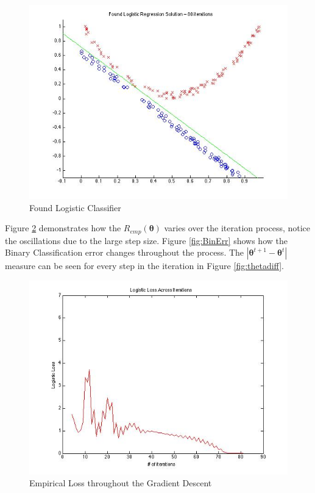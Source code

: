 \documentclass[paper=a4, fontsize=11pt]{scrartcl} %
\begin{document}
\begin{figure}
\centering
\includegraphics[scale=0.4]{prob3sol.jpg}
\caption{Found Logistic Classifier}
\label{fig:classifier}
\end{figure}

Figure \ref{fig:loss} demonstrates how the $R_{emp}(\bm{\theta})$ varies over the iteration process, notice the oscillations due to the large step size.  Figure \ref{fig:BinErr} shows how the Binary Classification error changes throughout the process.
The $| \bm{\theta} ^{t+1} -  \bm{\theta} ^t|$ measure can be seen for every step in the iteration in Figure \ref{fig:thetadiff}.

\begin{figure}
\centering
\includegraphics[scale=0.4]{logisticloss.jpg}
\caption{Empirical Loss throughout the Gradient Descent}
\label{fig:loss}
\end{figure}
\end{document}
